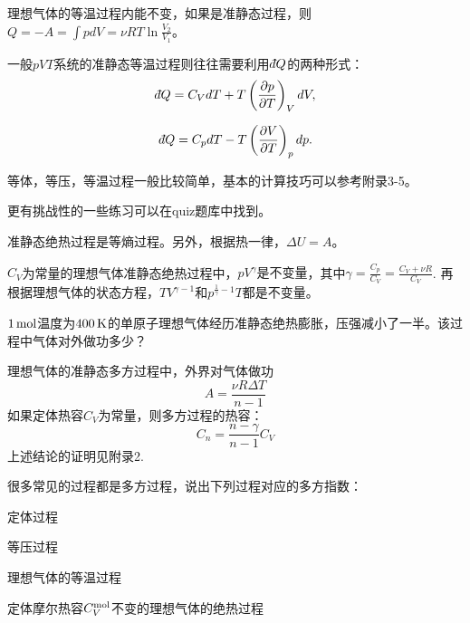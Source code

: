 \documentclass[CJK]{beamer}
\begin{document}
\begin{frame}
  \bchL
  {\blue 理想气体的等温过程内能不变}，如果是准静态过程，则$Q = -A = \int p dV = \nu RT \ln \frac{V_2}{V_1}$。

  \skipline
  
  一般$pVT$系统的准静态等温过程则往往需要利用$\dbar Q$的两种形式：
$$\dbar Q = C_V dT + T \pfrac pTV  dV,$$

 $$\dbar Q = C_p dT - T \pfrac VTp  dp.$$

  \echL
\end{frame}


\begin{frame}
  \bchL
  等体，等压，等温过程一般比较简单，基本的计算技巧可以参考附录3-5。

  
  更有挑战性的一些练习可以在quiz题库中找到。

  \echL
\end{frame}


\begin{frame}
  \bchL
  {\blue 准静态绝热过程是等熵过程}。另外，根据热一律，$\Delta U = A$。


  \skiplines
  
  $C_V$为常量的理想气体准静态{\blue 绝热}过程中，{\blue $pV^\gamma$是不变量}，其中$\gamma = \frac{C_p}{C_V} = \frac{C_V+\nu R}{C_V}$. 再根据理想气体的状态方程，{\blue $TV^{\gamma-1}$和$p^{\frac{1}{\gamma}-1}T$都是不变量}。
  \echL
\end{frame}


\begin{frame}
  \bchL
  $1\,\mathrm{mol}$温度为$400\,\mathrm{K}$的单原子理想气体经历准静态绝热膨胀，压强减小了一半。该过程中气体对外做功多少？
  \echL
\end{frame}

\begin{frame}
  \bchL
  理想气体的准静态多方过程中，外界对气体做功
  {\blue $$A = \frac{\nu R\Delta T}{n-1}$$}
  如果定体热容$C_V$为常量，则多方过程的热容：
  {\blue $$ C_n = \frac{n-\gamma}{n-1} C_V$$}
  上述结论的证明见附录2.
  \echL
\end{frame}


\begin{frame}
  \bchL
  很多常见的过程都是多方过程，说出下列过程对应的多方指数：
  \bitem
\item{定体过程}
\item{等压过程}
\item{理想气体的等温过程}
\item{  定体摩尔热容$C_V^{\rm mol}$不变的理想气体的绝热过程}
  \eitem

  \echL
\end{frame}
\end{document}

